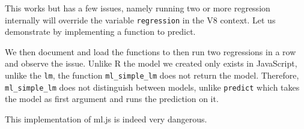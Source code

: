 \documentclass[
]{krantz}
\makeatletter
\newenvironment{Shaded}{\begin{snugshade}}{\end{snugshade}}
\newcommand{\CommentTok}[1]{\textcolor[rgb]{0.37,0.37,0.37}{\textit{#1}}}
\newcommand{\ControlFlowTok}[1]{\textcolor[rgb]{0.27,0.27,0.27}{\textbf{#1}}}
\newcommand{\DecValTok}[1]{\textcolor[rgb]{0.06,0.06,0.06}{#1}}
\newcommand{\KeywordTok}[1]{\textcolor[rgb]{0.27,0.27,0.27}{\textbf{#1}}}
\newcommand{\NormalTok}[1]{#1}
\newcommand{\OperatorTok}[1]{\textcolor[rgb]{0.43,0.43,0.43}{\textbf{#1}}}
\newcommand{\StringTok}[1]{\textcolor[rgb]{0.5,0.5,0.5}{#1}}
\newenvironment{kframe}{%
\medskip{}
\setlength{\fboxsep}{.8em}
 \def\at@end@of@kframe{}%
 \ifinner\ifhmode%
  \def\at@end@of@kframe{\end{minipage}}%
  \begin{minipage}{\columnwidth}%
 \fi\fi%
 \def\FrameCommand##1{\hskip\@totalleftmargin \hskip-\fboxsep
 \colorbox{shadecolor}{##1}\hskip-\fboxsep
     \hskip-\linewidth \hskip-\@totalleftmargin \hskip\columnwidth}%
 \MakeFramed {\advance\hsize-\width
   \@totalleftmargin\z@ \linewidth\hsize
   \@setminipage}}%
 {\par\unskip\endMakeFramed%
 \at@end@of@kframe}
\renewenvironment{Shaded}{\begin{kframe}}{\end{kframe}}
\makeatother
\begin{document}
\begin{Shaded}
\end{Shaded}

This works but has a few issues, namely running two or more regression internally will override the variable \texttt{regression} in the V8 context. Let us demonstrate by implementing a function to predict.

\begin{Shaded}
\end{Shaded}

We then document and load the functions to then run two regressions in a row and observe the issue. Unlike R the model we created only exists in JavaScript, unlike the \texttt{lm}, the function \texttt{ml\_simple\_lm} does not return the model. Therefore, \texttt{ml\_simple\_lm} does not distinguish between models, unlike \texttt{predict} which takes the model as first argument and runs the prediction on it.

This implementation of ml.js is indeed very dangerous.

\begin{Shaded}
\end{Shaded}
\end{document}
